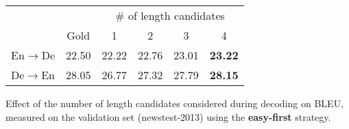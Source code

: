 \centering
\begin{tabular}{c||c|cccc}
& & \multicolumn{4}{c}{\# of length candidates}
\\
& Gold & 1 & 2 & 3 & 4 
\\
\toprule
En$\to$De & 22.50 & 22.22 & 22.76 & 23.01 & \textbf{23.22}
\\
De$\to$En & 28.05 & 26.77 & 27.32 & 27.79 & \textbf{28.15} 
\end{tabular}

\caption{Effect of the number of length candidates considered during decoding on BLEU, measured on the validation set (newstest-2013) using the {\bf easy-first} strategy.}